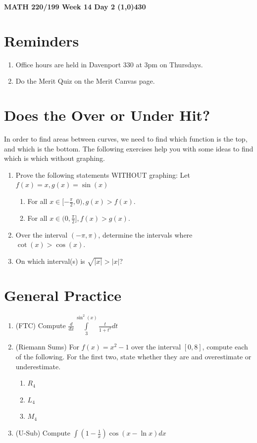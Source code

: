 \documentclass{article}
\begin{document}
\begin{center}
 \LARGE\bfseries MATH 220/199 Week 14 Day 2
 \line(1,0){430}
\end{center}
\section*{Reminders}
\begin{enumerate}
    \item Office hours are held in Davenport 330 at 3pm on Thursdays.
    \item Do the Merit Quiz on the Merit Canvas page.
\end{enumerate}
\section*{Does the Over or Under Hit?}
In order to find areas between curves, we need to find which function is the top, and which is the bottom. The following exercises help you with some ideas to find which is which without graphing.
\begin{enumerate}
    \item Prove the following statements WITHOUT graphing: Let $f(x) = x, g(x) = \sin(x)$
    \begin{enumerate}
        \item For all $x \in [-\frac{\pi}{2}, 0), g(x) > f(x)$.
        \item For all $x \in (0, \frac{\pi}{2}], f(x) > g(x)$.
    \end{enumerate}
    \vfill
    \item Over the interval $(-\pi, \pi)$, determine the intervals where $\cot(x) > \cos(x)$.
    \vfill
    \item On which interval(s) is $\sqrt{|x|}>|x|$?
    \vfill
\end{enumerate}
\newpage
\section*{General Practice}
\begin{enumerate}
    \item (FTC) Compute $\frac{d}{dx} \int\limits_{3}^{\sin^2(x)} \frac{t}{1+t^2} dt$
    \vfill
    \item (Riemann Sums) For $f(x) = x^2-1$ over the interval $[0, 8]$, compute each of the following. For the first two, state whether they are and overestimate or underestimate.
    \begin{enumerate}
        \item $R_4$
        \item $L_4$
        \item $M_4$
    \end{enumerate}
    \vfill
    \item (U-Sub) Compute $\int (1-\frac{1}{x}) \cos(x-\ln x) dx$
    \vfill
\end{enumerate}
\end{document}
